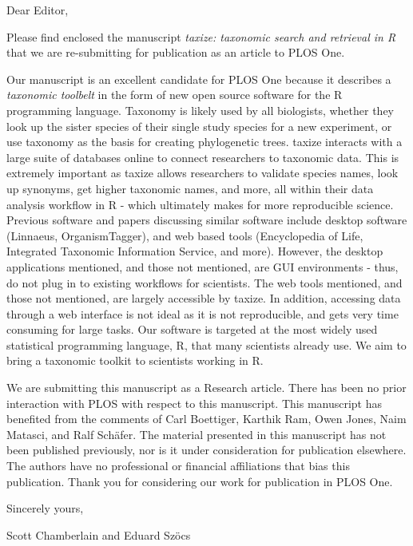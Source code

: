 \documentclass[11pt]{article}
\begin{document}
Dear Editor,

Please find enclosed the manuscript \emph{taxize: taxonomic search and retrieval in R} that we are re-submitting for publication as an article to PLOS One. 

Our manuscript is an excellent candidate for PLOS One because it describes a \emph{taxonomic toolbelt} in the form of new open source software for the R programming language. Taxonomy is likely used by all biologists, whether they look up the sister species of their single study species for a new experiment, or use taxonomy as the basis for creating phylogenetic trees. taxize interacts with a large suite of databases online to connect researchers to taxonomic data. This is extremely important as taxize allows researchers to validate species names, look up synonyms, get higher taxonomic names, and more, all within their data analysis workflow in R - which ultimately makes for more reproducible science. Previous software and papers discussing similar software include desktop software (Linnaeus, OrganismTagger), and web based tools (Encyclopedia of Life, Integrated Taxonomic Information Service, and more). However, the desktop applications mentioned, and those not mentioned, are GUI environments - thus, do not plug in to existing workflows for scientists.  The web tools mentioned, and those not mentioned, are largely accessible by taxize. In addition, accessing data through a web interface is not ideal as it is not reproducible, and gets very time consuming for large tasks. Our software is targeted at the most widely used statistical programming language, R, that many scientists already use. We aim to bring a taxonomic toolkit to scientists working in R.

We are submitting this manuscript as a Research article. There has been no prior interaction with PLOS with respect to this manuscript. This manuscript has benefited from the comments of Carl Boettiger, Karthik Ram, Owen Jones, Naim Matasci, and Ralf Sch\"{a}fer. The material presented in this manuscript has not been published previously, nor is it under consideration for publication elsewhere. The authors have no professional or financial affiliations that bias this publication. Thank you for considering our work for publication in PLOS One.

\flushleft
Sincerely yours,

Scott Chamberlain and Eduard Sz\"{o}cs
\endflushleft
\end{document}
